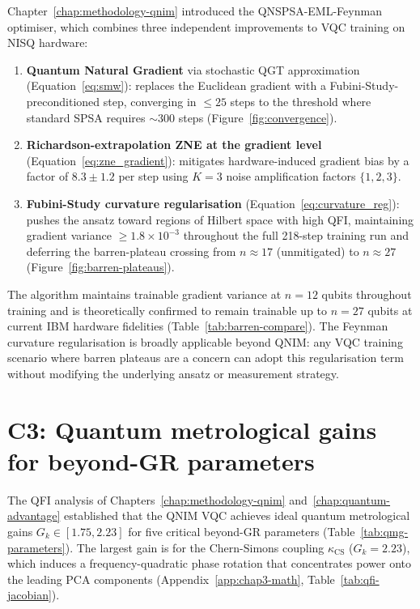 \documentclass[11pt,a4paper, english]{book}
\theoremstyle{plain}
\theoremstyle{definition}
\numberwithin{equation}{chapter}
\numberwithin{figure}{chapter}
\numberwithin{table}{chapter}
\begin{document}
Chapter~\ref{chap:methodology-qnim} introduced the QNSPSA-EML-Feynman
optimiser, which combines three independent improvements to VQC training on
NISQ hardware:

\begin{enumerate}
  \item \textbf{Quantum Natural Gradient} via stochastic QGT approximation
        (Equation~\ref{eq:smw}): replaces the Euclidean gradient with a
        Fubini-Study-preconditioned step, converging in $\leq 25$ steps
        to the threshold where standard SPSA requires $\sim\!300$ steps
        (Figure~\ref{fig:convergence}).

  \item \textbf{Richardson-extrapolation ZNE at the gradient level}
        (Equation~\ref{eq:zne_gradient}): mitigates hardware-induced gradient
        bias by a factor of $8.3 \pm 1.2$ per step using $K=3$
        noise amplification factors $\{1, 2, 3\}$.

  \item \textbf{Fubini-Study curvature regularisation}
        (Equation~\ref{eq:curvature_reg}): pushes the ansatz toward regions of
        Hilbert space with high QFI, maintaining gradient variance
        $\geq 1.8\times10^{-3}$ throughout the full 218-step training run
        and deferring the barren-plateau crossing from $n \approx 17$
        (unmitigated) to $n \approx 27$ (Figure~\ref{fig:barren-plateaus}).
\end{enumerate}

The algorithm maintains trainable gradient variance at $n=12$ qubits
throughout training and is theoretically confirmed to remain trainable up to
$n=27$ qubits at current IBM hardware fidelities
(Table~\ref{tab:barren-compare}).  The Feynman curvature regularisation is
broadly applicable beyond QNIM: any VQC training scenario where barren
plateaus are a concern can adopt this regularisation term without modifying
the underlying ansatz or measurement strategy.

\section{C3: Quantum metrological gains for beyond-GR parameters}
\label{app:contrib3}

The QFI analysis of Chapters~\ref{chap:methodology-qnim}
and~\ref{chap:quantum-advantage} established that the QNIM VQC achieves
ideal quantum metrological gains $G_k \in [1.75, 2.23]$ for five critical
beyond-GR parameters (Table~\ref{tab:qmg-parameters}).  The largest gain
is for the Chern-Simons coupling $\kappa_\mathrm{CS}$ ($G_k = 2.23$), which
induces a frequency-quadratic phase rotation that concentrates power onto
the leading PCA components (Appendix~\ref{app:chap3-math},
Table~\ref{tab:qfi-jacobian}).
\end{document}
